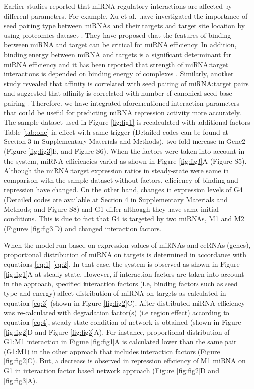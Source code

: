 \documentclass[a4,center,fleqn]{NAR}
\begin{document}
Earlier studies reported that miRNA regulatory interactions are affected
by different parameters. For example, Xu et al.~have investigated the
importance of seed pairing type between miRNAs and their targets and
target site location by using proteomics dataset
\citep{xu_characterization_2014}. They have proposed that the features
of binding between miRNA and target can be critical for miRNA
efficiency. In addition, binding energy between miRNA and targets is a
significant determinant for miRNA efficiency and it has been reported
that strength of miRNA:target interactions is depended on binding energy
of complexes \citep{breda_quantifying_2015}. Similarly, another study
revealed that affinity is correlated with seed pairing of miRNA:target
pairs and suggested that affinity is correlated with number of canonical
seed base pairing \citep{bosson_endogenous_2014}. Therefore, we have
integrated aforementioned interaction parameters that could be useful
for predicting miRNA repression activity more accurately. The sample
dataset used in Figure \ref{fig:fig1} is recalculated with additional
factors Table \ref{tab:one} in effect with same trigger (Detailed codes
can be found at Section 3 in Supplementary Materials and Methods), two
fold increase in Gene2 (Figure \ref{fig:fig3}B, and Figure S6). When the
factors were taken into account in the system, miRNA efficiencies varied
as shown in Figure \ref{fig:fig3}A (Figure S5). Although the
miRNA:target expression ratios in steady-state were same in comparison
with the sample dataset without factors, efficiency of binding and
repression have changed. On the other hand, changes in expression levels
of G4 (Detailed codes are available at Section 4 in Supplementary
Materials and Methods; and Figure S8) and G1 differ although they have
same initial conditions. This is due to fact that G4 is targeted by two
miRNAs, M1 and M2 (Figures \ref{fig:fig3}D) and changed interaction
factors.

When the model run based on expression values of miRNAs and ceRNAs
(genes), proportional distribution of miRNA on targets is determined in
accordance with equations \eqref{eq:1} \eqref{eq:2}. In that case, the
system is observed as shown in Figure \ref{fig:fig1}A at steady-state.
However, if interaction factors are taken into account in the approach,
specified interaction factors (i.e, binding factors such as seed type
and energy) affect distribution of miRNA on targets as calculated in
equation \eqref{eq:3} (shown in Figure \ref{fig:fig2}C). After
distributed miRNA efficiency was re-calculated with degradation
factor(s) (i.e region effect) according to equation \eqref{eq:4},
steady-state condition of network is obtained (shown in Figure
\ref{fig:fig2}D and Figure \ref{fig:fig3}A). For instance, proportional
distribution of G1:M1 interaction in Figure \ref{fig:fig1}A is
calculated lower than the same pair (G1:M1) in the other approach that
includes interaction factors (Figure \ref{fig:fig2}C). But, a decrease
is observed in repression efficiency of M1 miRNA on G1 in interaction
factor based network approach (Figure \ref{fig:fig2}D and
\ref{fig:fig3}A).
\end{document}

